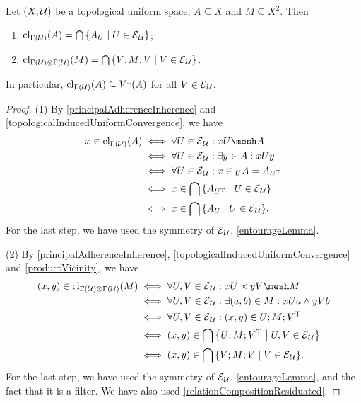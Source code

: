 \begin{proposition} \label{closureTopologicalUniformSpace}
Let $\sSet{X,\mathcal{U}}$ be a topological uniform space, $A\subseteq X$ and $M\subseteq X^2$. Then
\begin{enumerate}
\item $\closure_{\Gamma(\mathcal{U})}(A) = \bigcap\setbuilder{A_U}{U\in \entourage_\mathcal{U}}$;
\item $\closure_{\Gamma(\mathcal{U})\otimes \Gamma(\mathcal{U})}(M) = \bigcap\setbuilder{V;M;V}{V\in\entourage_\mathcal{U}}$.
\end{enumerate}
\end{proposition}
In particular, $\operatorname{cl}_{\Gamma(\mathcal{U})}(A) \subseteq V^\downarrow(A)$ for all $V\in \operatorname{\mathcal{E}}_\mathcal{U}$.
\begin{proof}
(1) By \ref{principalAdherenceInherence} and \ref{topologicalInducedUniformConvergence}, we have
\begin{align*}
x\in \closure_{\Gamma(\mathcal{U})}(A) &\iff \forall U\in \entourage_\mathcal{U}: xU \mesh A \\
&\iff \forall U\in \entourage_\mathcal{U}: \exists y\in A: xUy \\
&\iff \forall U\in \entourage_\mathcal{U}: x\in {_U}A = A_{U^\transp} \\
&\iff x\in\bigcap\setbuilder{A_{U^\transp}}{U\in \entourage_\mathcal{U}} \\
&\iff x\in\bigcap\setbuilder{A_U}{U\in \entourage_\mathcal{U}}.
\end{align*}
For the last step, we have used the symmetry of $\operatorname{\mathcal{E}}_\mathcal{U}$, \ref{entourageLemma}.

(2) By \ref{principalAdherenceInherence}, \ref{topologicalInducedUniformConvergence} and \ref{productVicinity}, we have
\begin{align*}
(x,y) \in \closure_{\Gamma(\mathcal{U})\otimes \Gamma(\mathcal{U})}(M) &\iff \forall U,V\in \entourage_\mathcal{U}: xU \times yV \mesh M \\
&\iff \forall U,V\in \entourage_\mathcal{U}:\exists (a,b)\in M: xUa \land yVb \\
&\iff \forall U,V\in \entourage_\mathcal{U}:(x,y) \in U;M;V^\transp \\
&\iff (x,y) \in \bigcap\setbuilder{U;M;V^\transp}{U,V\in\entourage_\mathcal{U}} \\
&\iff (x,y) \in \bigcap\setbuilder{V;M;V}{V\in\entourage_\mathcal{U}}.
\end{align*}
For the last step, we have used the symmetry of $\operatorname{\mathcal{E}}_\mathcal{U}$, \ref{entourageLemma}, and the fact that it is a filter. We have also used \ref{relationCompositionResiduated}.
\end{proof}
